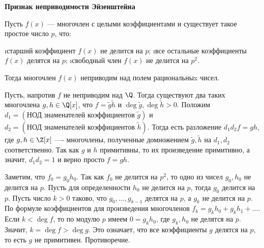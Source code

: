 \begin{problem}[24(6.1)]
\bf{Признак неприводимости Эйзенштейна}

Пусть $f(x)$ --- многочлен с целыми коэффициентами и существует такое простое число $p$, что:

\begin{enumerate}
\i старший коэффициент $f(x)$ не делится на $p$;
\i все остальные коэффициенты $f(x)$ делятся на $p$;
\i свободный член $f(x)$ не делится на $p^2$.
\end{enumerate}
Тогда многочлен $f(x)$ неприводим над полем рациональныx чисел.
\end{problem}

\begin{solution}
Пусть, напротив \(f\) не неприводим над \(\Q\). Тогда существуют два таких многочлена \(g,h\in\Q[x]\), что
\(f=\tilde{g}\tilde{h}\) и \(\deg{\tilde{g}}, \deg{\tilde{h}} > 0\).
Положим \(d_1 = (\text{НОД знаменателей коэффициентов }\tilde{g})\) и \(d_2 = (\text{НОД знаменателей коэффициентов }\tilde{h})\). Тогда есть разложение \(d_1 d_2 f = g h\), где \(g, h \in \Z[x]\) ---- многочлены, полученные домножением \(\tilde{g},\tilde{h}\) на \(d_1,d_2\) соответственно. Так как \(g\) и \(h\) примитивны, то их произведение примитивно, а значит, \(d_1 d_2 = 1\) и верно просто \(f = gh\).

Заметим, что \(f_0 = g_0 h_0\). Так как \(f_0\) не делится на \(p^2\), то одно из чисел \(g_0, h_0\) не делится на \(p\). Пусть для определенности \(h_0\) не делится на \(p\), тогда \(g_0\) делится на \(p\). Пусть число \(k > 0\) таково, что \(g_0, \ldots, g_{k-1}\) делятся на \(p\), а \(g_k\) не делится на \(p\). По формуле коэффициентов для произведения многочленов \(f_k = g_k h_0 + g_k h_1 + \ldots\). Если \(k < \deg f\), то по модулю \(p\) имеем \(0 = g_k h_0\), где \(g_k, h_0\) не делятся на \(p\). Значит, \(k = \deg f > \deg g\). Это означает, что все коэффициенты \(g\) делятся на \(p\), то есть \(g\) не примитивен.
Противоречие.




\end{solution}
